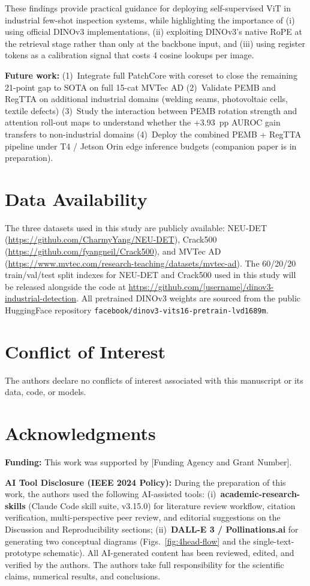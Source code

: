 \documentclass[journal]{IEEEtran}
\begin{document}
These findings provide practical guidance for deploying self-supervised ViT in industrial few-shot inspection systems, while highlighting the importance of (i) using official DINOv3 implementations, (ii) exploiting DINOv3's native RoPE at the retrieval stage rather than only at the backbone input, and (iii) using register tokens as a calibration signal that costs 4 cosine lookups per image.

\textbf{Future work:} (1)~Integrate full PatchCore with coreset to close the remaining 21-point gap to SOTA on full 15-cat MVTec AD (2)~Validate PEMB and RegTTA on additional industrial domains (welding seams, photovoltaic cells, textile defects) (3)~Study the interaction between PEMB rotation strength and attention roll-out maps to understand whether the +3.93~pp AUROC gain transfers to non-industrial domains (4)~Deploy the combined PEMB + RegTTA pipeline under T4 / Jetson Orin edge inference budgets (companion paper is in preparation).

\section*{Data Availability}
The three datasets used in this study are publicly available: NEU-DET~\cite{ref4,ref7} (\url{https://github.com/CharmyYang/NEU-DET}), Crack500 (\url{https://github.com/fyangneil/Crack500}), and MVTec AD~\cite{ref31} (\url{https://www.mvtec.com/research-teaching/datasets/mvtec-ad}). The 60/20/20 train/val/test split indexes for NEU-DET and Crack500 used in this study will be released alongside the code at \url{https://github.com/[username]/dinov3-industrial-detection}. All pretrained DINOv3 weights are sourced from the public HuggingFace repository \texttt{facebook/dinov3-vits16-pretrain-lvd1689m}.

\section*{Conflict of Interest}
The authors declare no conflicts of interest associated with this manuscript or its data, code, or models.

\section*{Acknowledgments}
\textbf{Funding:} This work was supported by [Funding Agency and Grant Number].

\textbf{AI Tool Disclosure (IEEE 2024 Policy):} During the preparation of this work, the authors used the following AI-assisted tools: (i)~\textbf{academic-research-skills} (Claude Code skill suite, v3.15.0) for literature review workflow, citation verification, multi-perspective peer review, and editorial suggestions on the Discussion and Reproducibility sections; (ii)~\textbf{DALL-E 3 / Pollinations.ai} for generating two conceptual diagrams (Figs.~\ref{fig:4head-flow} and the single-text-prototype schematic). All AI-generated content has been reviewed, edited, and verified by the authors. The authors take full responsibility for the scientific claims, numerical results, and conclusions.
\end{document}
